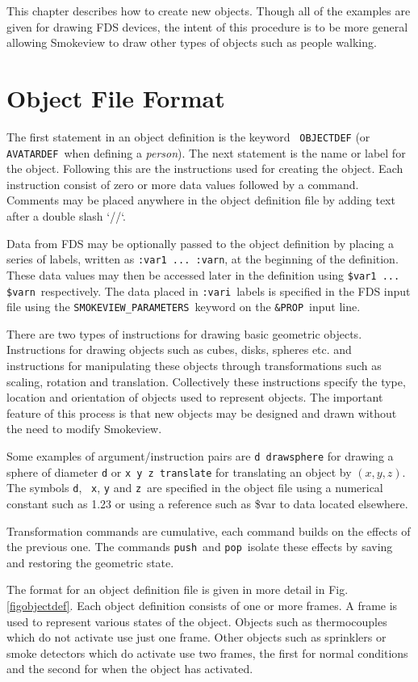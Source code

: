 \documentclass[11pt,twoside]{book}
\begin{document}
This chapter describes how to create new objects. Though all of
the examples are given for drawing FDS devices, the intent of this
procedure is to be more general allowing Smokeview to draw other
types of objects such as people walking.

\section{Object File Format}
The first statement in an object definition is the keyword {\tt
OBJECTDEF} (or {\tt AVATARDEF}\ when defining a {\em person}). The
next statement is the name or label for the object. Following this
are the instructions used for creating the object. Each
instruction consist of zero or more data values followed by a
command. Comments may be placed anywhere in the object definition
file by adding text after a double slash `//`.

Data from FDS may be optionally passed to the object definition by
placing a series of labels, written as {\tt :var1 ... :varn}, at
the beginning of the definition.  These data values may then be
accessed later in the definition using {\tt \$var1 ... \$varn}\
respectively. The data placed in {\tt :vari}\ labels is specified
in the FDS input  file using the {\tt SMOKEVIEW\_PARAMETERS}\
keyword on the {\tt \&PROP}\ input line.

There are two types of instructions for drawing basic geometric
objects.  Instructions for drawing objects such as cubes, disks,
spheres etc.  and instructions for manipulating these objects
through transformations such as scaling, rotation and translation.
Collectively these instructions specify the type, location and
orientation of objects used to represent objects.  The important
feature of this process is that new objects may be designed and
drawn without the need to modify Smokeview.

Some examples of argument/instruction pairs are {\tt d drawsphere}
for drawing a sphere of diameter {\tt d} or {\tt x y z translate}
for translating an object by $(x,y,z)$. The symbols {\tt d}, {\tt
x}, {\tt y} and {\tt z}\ are specified in the object file using a
numerical constant such as 1.23 or using a reference such as \$var
to data located elsewhere.

Transformation commands are cumulative, each command builds on the
effects of the previous one.  The commands {\tt push}\ and
{\tt pop}\ isolate these effects by saving and restoring the geometric state.

The format for an object definition file is given in more detail
in Fig. \ref{figobjectdef}.  Each object definition consists of
one or more frames.  A frame is used to represent various states
of the object. Objects such as thermocouples which do not activate
use just one frame. Other objects such as sprinklers or smoke
detectors which do activate use two frames, the first for normal
conditions and the second for when the object has activated.
\end{document}
